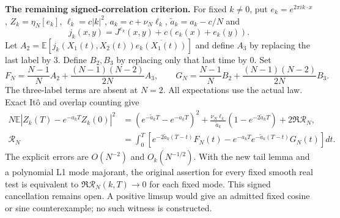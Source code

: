 \documentclass[11pt]{article}
\newcommand{\E}{\mathbb E}
\begin{document}
\noindent\textbf{The remaining signed-correlation criterion.}
For fixed $k\ne0$, put $e_k=e^{2\pi i k\cdot x}$, $Z_k=\eta_N[e_k]$, $\ell_k=c|k|^2$, $a_k=c+\nu_N\ell_k$, $\widetilde a_k=a_k-c/N$ and
\[
 j_k(x,y)=J^{e_k}(x,y)+c(e_k(x)+e_k(y)).
\]
Let $A_2=\E[j_k(X_1(t),X_2(t))\overline{e_k(X_1(t))}]$ and define $A_3$ by replacing the last label by $3$. Define $B_2,B_3$ by replacing only that last time by $0$. Set
\[
 F_N=\frac{N-1}{N}A_2+\frac{(N-1)(N-2)}{2N}A_3,\qquad
 G_N=\frac{N-1}{N}B_2+\frac{(N-1)(N-2)}{2N}B_3.
\]
The three-label terms are absent at $N=2$. All expectations use the actual law. Exact It\^o and overlap counting give
\[
 \begin{split}
 N\E|Z_k(T)-e^{-a_kT}Z_k(0)|^2
 &= (e^{-\widetilde a_kT}-e^{-a_kT})^2
 +\frac{\nu_N\ell_k}{\widetilde a_k}(1-e^{-2\widetilde a_kT})+2\Re\mathcal R_N,\\
 \mathcal R_N&=\int_0^T\left[e^{-2\widetilde a_k(T-t)}F_N(t)
 -e^{-a_kT}e^{-\widetilde a_k(T-t)}G_N(t)\right]dt.
 \end{split}
\]
The explicit errors are $O(N^{-2})$ and $O_k(N^{-1/2})$. With the new tail lemma and a polynomial L1 mode majorant, the original assertion for every fixed smooth real test is equivalent to $\Re\mathcal R_N(k,T)\to0$ for each fixed mode. This signed cancellation remains open. A positive limsup would give an admitted fixed cosine or sine counterexample; no such witness is constructed.
\end{document}
